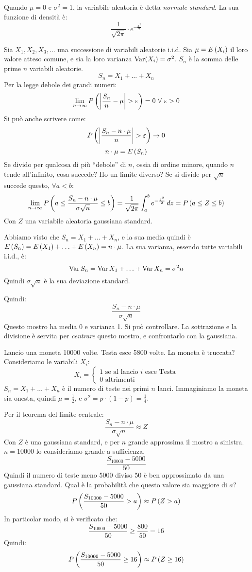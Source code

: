 Quando $\mu = 0$ e $\sigma^2 = 1$, la variabile aleatoria \`e detta \emph{normale standard}. La sua funzione di densit\`a \`e:
\[
\frac{1}{\sqrt{2 \pi}} \cdot e^{-\frac{x^2}{2}}
\]
\begin{theorem}
Sia $X_1, X_2, X_3, \ldots$ una successione di variabili aleatorie i.i.d. Sia $\mu = E \left( X_i \right)$ il loro valore atteso comune, e sia la loro varianza $\operatorname{Var}(X_i) = \sigma^2$. $S_n$ \`e la somma delle prime $n$ variabili aleatorie.
\[
S_n = X_1 + \ldots + X_n
\]
Per la legge debole dei grandi numeri:
\[
\lim_{n \to \infty} \prob{ \abs{ \frac{S_n}{n} - \mu} > \varepsilon} = 0 \forall \varepsilon > 0
\]
Si pu\`o anche scrivere come:
\[
P \left( { \left\lvert{\frac{S_n - n \cdot \mu}{n}}\right\rvert > \varepsilon} \right) \to 0
\]
\[
n \cdot \mu = E \left( S_n \right)
\]
Se divido per qualcosa di pi\`u ``debole'' di $n$, ossia di ordine minore, quando $n$ tende all'infinito, cosa succede? Ho un limite diverso? Se si divide per $\sqrt{n}$ succede questo, $\forall a < b$:
\[
\lim_{n \to \infty} 
P \left( {a \le \frac{S_n - n \cdot \mu}{\sigma \sqrt{n}} \le b} \right) = 
\frac{1}{\sqrt{2 \pi}} \int_{a}^{b} e^{-\frac{z^2}{2}} \, dz = 
P \left( {a \le Z \le b} \right)
\]
Con $Z$ una variabile aleatoria gaussiana standard.
\end{theorem}

Abbiamo visto che $S_n = X_1 + \ldots + X_n$, e la sua media quindi \`e $E \left( S_n \right) = E \left( X_1 \right) + \ldots + E \left( X_n \right) = n \cdot \mu$. La sua varianza, essendo tutte variabili i.i.d., \`e:
\[
\operatorname{Var}{S_n} = \operatorname{Var}{X_1} + \ldots + \operatorname{Var}{X_n} = \sigma^2 n
\]
Quindi $\sigma \sqrt{n}$ \`e la sua deviazione standard.

Quindi:
\[
\frac{S_n - n \cdot \mu}{\sigma \sqrt{n}}
\]
Questo mostro ha media 0 e varianza 1. Si pu\`o controllare. La sottrazione e la divisione \`e servita per \emph{centrare} questo mostro, e confrontarlo con la gaussiana.

\begin{exmp}
Lancio una moneta 10000 volte. Testa esce 5800 volte. La moneta \`e truccata? Consideriamo le variabili $X_i$:
\[
X_i =
\begin{cases}
1 \text{ se al lancio $i$ esce Testa} \\
0 \text{ altrimenti}
\end{cases}
\]
$S_n = X_1 + \ldots + X_n$ \`e il numero di teste nei primi $n$ lanci. Immaginiamo la moneta sia onesta, quindi $\mu = \frac{1}{2}$, e $\sigma^2 = p \cdot (1 - p) = \frac{1}{4}$.

Per il teorema del limite centrale:
\[
\frac{S_n - n \cdot \mu}{\sigma \sqrt{n}} \approx Z
\]
Con $Z$ \`e una gaussiana standard, e per $n$ grande approssima il mostro a sinistra. $n = 10000$ lo consideriamo grande a sufficienza.
\[
\frac{S_{10000} - 5000}{50}
\]
Quindi il numero di teste meno 5000 diviso 50 \`e ben approssimato da una gaussiana standard. Qual \`e la probabilit\`a che questo valore sia maggiore di $a$?
\[
P \left( { \frac{S_{10000} - 5000}{50} > a} \right) \approx P \left( {Z > a} \right)
\]
In particolar modo, si \`e verificato che:
\[
\frac{S_{10000} - 5000}{50} \ge \frac{800}{50} = 16
\]
Quindi:
\[
P \left( {\frac{S_{10000} - 5000}{50} \ge 16} \right) \approx P \left( {Z \ge 16} \right)
\]
\end{exmp}


